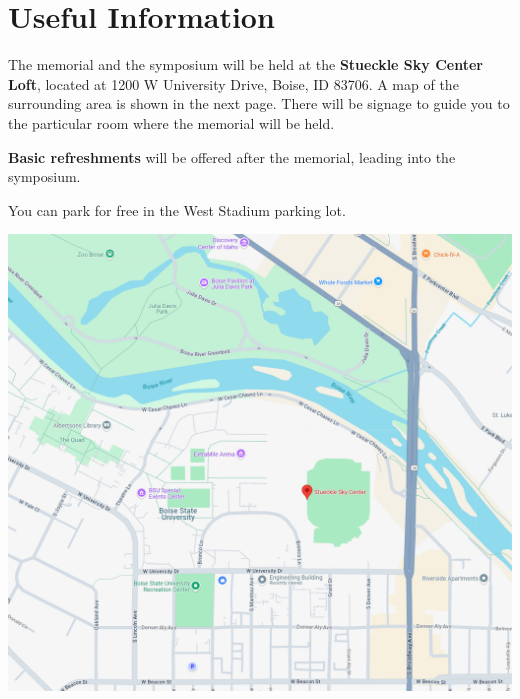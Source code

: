 \documentclass[
	openany, %
	parskip=full, %
	12pt, %
	letterpaper, %
]{conferencebooklet} %
\begin{document}

\chapter{Useful Information}

The memorial and the symposium will be held at the \textbf{Stueckle Sky Center
Loft}, located at 1200 W University Drive, Boise, ID 83706. A map of the
surrounding area is shown in the next page. There will be signage to guide you 
to the particular room where the memorial will be held.

\textbf{Basic refreshments} will be offered after the memorial, leading into the
symposium.

You can park for free in the West Stadium parking lot.

\newpage

\includegraphics[width=\linewidth]{images/stueckle_map}





~

\end{document}
